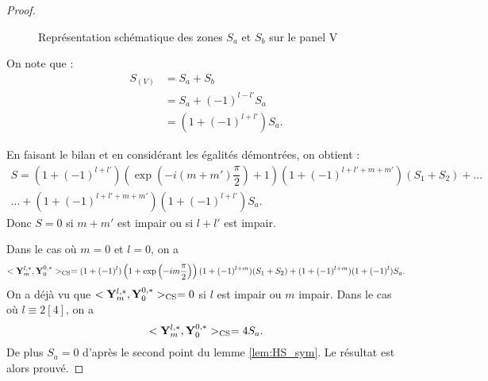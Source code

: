 \begin{proof}
\begin{figure}
\begin{center}
\end{center}
\caption{Représentation schématique des zones $S_a$ et $S_b$ sur le panel V}
\label{fig: zones panel V}
\end{figure}
On note que :
\begin{align*}
S_{(V)} & = S_a + S_b \\
		& = S_a + (-1)^{l-l'}S_a \\
		& = (1 + (-1)^{l+l'})S_a.
\end{align*}

En faisant le bilan et en considérant les égalités démontrées, on obtient :
\begin{multline}
S = (1+(-1)^{l+l'})\left( \exp \left( -i(m+m') \dfrac{\pi}{2} \right) +1 \right)(1 +(-1)^{l+l'+m+m'})(S_1+S_2) + ...  \\
... + (1+(-1)^{l+l'+m+m'})(1 + (-1)^{l+l'})S_a.
\end{multline}
Donc $S=0$ si $m+m'$ est impair ou si $l+l'$ est impair.

Dans le cas où $m=0$ et $l=0$, on a
\begin{equation}
<\mathbf{Y}_m^{l,*},\mathbf{Y}_0^{0,*} >_{\text{CS}} = (1+(-1)^l)\left( 1 + \exp \left( -im \dfrac{\pi}{2} \right) \right) (1 + (-1)^{l+m}) (S_1+S_2) + (1+(-1)^{l+m})(1+(-1)^l)S_a.
\end{equation}
On a déjà vu que $<\mathbf{Y}_m^{l,*},\mathbf{Y}_0^{0,*} >_{\text{CS}} = 0$ si $l$ est impair ou $m$ impair. Dans le cas où $l \equiv 2 [4]$, on a
\begin{equation}
<\mathbf{Y}_m^{l,*},\mathbf{Y}_0^{0,*} >_{\text{CS}} = 4 S_a.
\end{equation}
De plus $S_a = 0$ d'après le second point du lemme \ref{lem:HS_sym}. Le résultat est alors prouvé. 
\end{proof}

